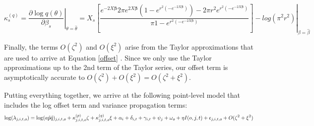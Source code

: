 \documentclass[12pt]{article}
\begin{document}

\begin{equation*}\label{kappa_q}
	\kappa_{s}^{(q)} = \left. \dfrac{\partial \log q(\theta)}{\partial \beta_s} \right\vert_{\theta = \hat{\theta}}= \left. X_s \left[\dfrac{{e^{-2X\boldsymbol{\beta}}} {2 \pi  e^{2X\boldsymbol{\beta}}} {\left(1 - e^{r^2 \left(-e^{-2X\boldsymbol{\beta}}\right)}\right)} - {2\pi r^2} {e^{r^2 \left(-e^{-2X\boldsymbol{\beta}}\right)}}}             {\pi {1-e^{r^2 \left(-e^{-2X\boldsymbol{\beta}}\right)}}}\right]  - log(\pi^2r^2) \right\vert_{\beta = \hat{\beta}}
\end{equation*}

Finally, the terms $O(\zeta^2)$ and $O(\xi^2)$ arise from the Taylor approximations that are used to arrive at Equation \ref{offset} \citep{bravington_variance_2021}. Since we only use the Taylor approximations up to the 2nd term of the Taylor series, our offset term is asymptotically accurate to $O(\zeta^2) + O(\xi^2) = O(\zeta^2 + \xi^2)$.

Putting everything together, we arrive at the following point-level model that includes the log offset term and variance propagation terms:
\begin{equation}\label{bbs_varprop}
	\log(\lambda_{j,i,t,o}) = \log(a \hat{p} \hat{q})_{j,i,t,o} + \kappa_{j,i,t,o}^{(p)}\zeta + \kappa_{j,i,t,o}^{(q)}\xi + \alpha_i + \delta_{i,t} + \gamma_{i,t} + \psi_j + \omega_o + \eta I(o,j,t) + \epsilon_{j,i,t,o} + O(\zeta^2 + \xi^2) \\
\end{equation}


	
\end{document}
